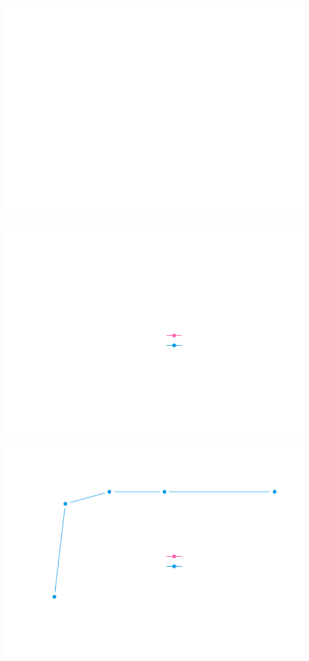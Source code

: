 \documentclass{article}\usepackage[]{graphicx}\usepackage[]{color}
\newenvironment{knitrout}{}{} %
\begin{document}
\begin{knitrout}
\color{fgcolor}
\includegraphics[width=\textwidth]{figure/resultsdynhet-1} 

\includegraphics[width=\textwidth]{figure/resultsdynhet-2} 

\includegraphics[width=\textwidth]{figure/resultsdynhet-3} 


\end{knitrout}
\end{document}
